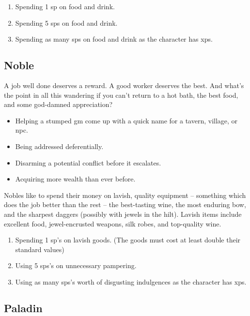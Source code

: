 \begin{multicols}{2}
\begin{enumerate}
  \item
  Spending 1 \gls{sp} on food and drink.
  \item
  Spending 5 \glspl{sp} on food and drink.
  \item
  Spending as many \glspl{sp} on food and drink as the character has \glspl{xp}.
\end{enumerate}

\subsection{Noble}

A job well done deserves a reward.
A good worker deserves the best.
And what's the point in all this wandering if you can't return to a hot bath, the best food, and some god-damned appreciation?

\begin{itemize}

  \item
  Helping a stumped \gls{gm} come up with a quick name for a tavern, village, or \gls{npc}.
  \item
  Being addressed deferentially.
  \item
  Disarming a potential conflict before it escalates.
  \item
  Acquiring more wealth than ever before.

\end{itemize}

Nobles like to spend their money on lavish, quality equipment -- something which does the job better than the rest -- the best-tasting wine, the most enduring bow, and the sharpest daggers (possibly with jewels in the hilt).
Lavish items include excellent food, jewel-encrusted weapons, silk robes, and top-quality wine.

\begin{enumerate}
  \item
  Spending 1 \gls{sp}'s on lavish goods.
  (The goods must cost at least double their standard values)
  \item
  Using 5 \glspl{sp}'s on unnecessary pampering.
  \item
  Using as many \glspl{sp}'s worth of disgusting indulgences as the character has \glspl{xp}.
\end{enumerate}

\subsection{Paladin}


\end{multicols}
